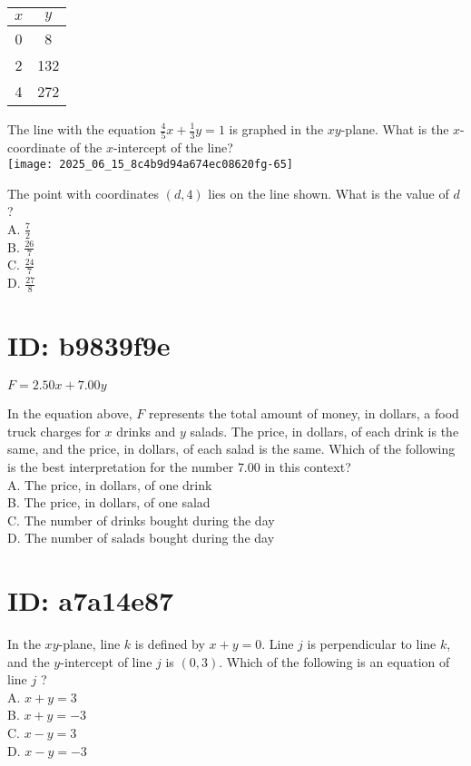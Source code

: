 \begin{center}
\begin{tabular}{|c|c|}
\hline
$x$ & $y$ \\
\hline
0 & 8 \\
\hline
2 & 132 \\
\hline
4 & 272 \\
\hline
\end{tabular}
\end{center}

The line with the equation $\frac{4}{5} x+\frac{1}{3} y=1$ is graphed in the $x y$-plane. What is the $x$-coordinate of the $x$-intercept of the line?\\
\texttt{[image: 2025\_06\_15\_8c4b9d94a674ec08620fg-65]}

The point with coordinates $(d, 4)$ lies on the line shown. What is the value of $d$ ?\\
A. $\frac{7}{2}$\\
B. $\frac{26}{7}$\\
C. $\frac{24}{7}$\\
D. $\frac{27}{8}$

\section*{ID: b9839f9e}
$F=2.50 x+7.00 y$

In the equation above, $F$ represents the total amount of money, in dollars, a food truck charges for $x$ drinks and $y$ salads. The price, in dollars, of each drink is the same, and the price, in dollars, of each salad is the same. Which of the following is the best interpretation for the number 7.00 in this context?\\
A. The price, in dollars, of one drink\\
B. The price, in dollars, of one salad\\
C. The number of drinks bought during the day\\
D. The number of salads bought during the day

\section*{ID: a7a14e87}
In the $x y$-plane, line $k$ is defined by $x+y=0$. Line $j$ is perpendicular to line $k$, and the $y$-intercept of line $j$ is $(0,3)$. Which of the following is an equation of line $j$ ?\\
A. $x+y=3$\\
B. $x+y=-3$\\
C. $x-y=3$\\
D. $x-y=-3$

